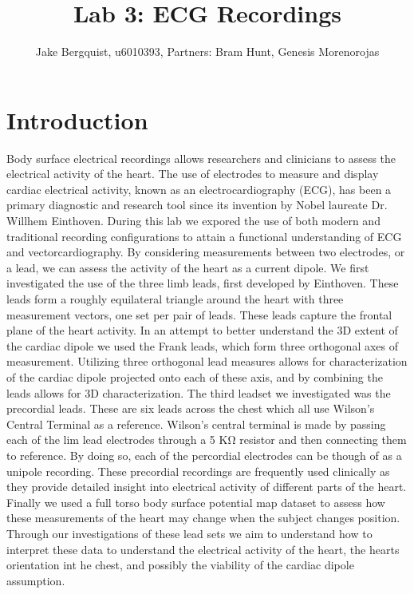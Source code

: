\documentclass[12pt]{article}
\begin{document}
\title{Lab 3: ECG Recordings}
\author{Jake Bergquist, u6010393, Partners: Bram Hunt, Genesis Morenorojas }
\maketitle

\section{Introduction}
\par{}
Body surface electrical recordings allows researchers and clinicians to assess the electrical activity of the heart. The use of electrodes to measure and display cardiac electrical activity, known as an electrocardiography (ECG), has been a primary diagnostic and research tool since its invention by Nobel laureate Dr. Willhem Einthoven. During this lab we expored the use of both modern and traditional recording configurations to attain a functional understanding of ECG and vectorcardiography. By considering measurements between two electrodes, or a lead, we can assess the activity of the heart as a current dipole. We first investigated the use of the three limb leads, first developed by Einthoven. These leads form a roughly equilateral triangle around the heart with three measurement vectors, one set per pair of leads. These leads capture the frontal plane of the heart activity. In an attempt to better understand the 3D extent of the cardiac dipole we used the Frank leads, which form three orthogonal axes of measurement. Utilizing three orthogonal lead measures allows for characterization of the cardiac dipole projected onto each of these axis, and by combining the leads allows for 3D characterization. The third leadset we investigated was the precordial leads. These are six leads across the chest which all use Wilson's Central Terminal as a reference. Wilson's central terminal is made by passing each of the lim lead electrodes through a 5 K\si{\ohm} resistor and then connecting them to reference. By doing so, each of the percordial electrodes can be though of as a unipole recording. These precordial recordings are frequently used clinically as they provide detailed insight into electrical activity of different parts of the heart. Finally we used a full torso body surface potential map dataset to assess how these measurements of the heart may change when the subject changes position. Through our investigations of these lead sets we aim to understand how to interpret these data to understand the electrical activity of the heart, the hearts orientation int he chest, and possibly the viability of the cardiac dipole assumption.
\end{document}
